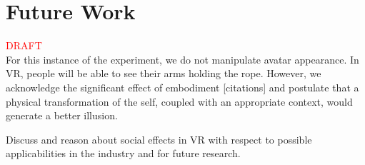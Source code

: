 \section{Future Work}
\textcolor{red}{DRAFT}\\


For this instance of the experiment, we do not manipulate avatar appearance. In VR, people will be able to see their arms holding the rope. However, we acknowledge the significant effect of embodiment [citations] and postulate that a physical transformation of the self, coupled with an appropriate context, would generate a better illusion.

Discuss and reason about social effects in VR with respect to possible applicabilities in
the industry and for future research.

